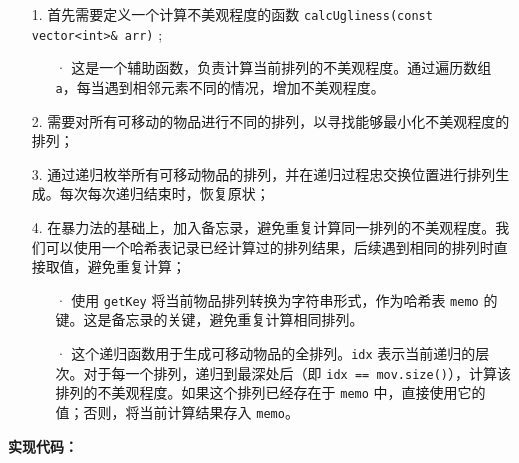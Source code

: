 \documentclass[a4paper]{ctexart}
\begin{document}
\begin{itemize}
	\item[1.] 首先需要定义一个计算不美观程度的函数 \texttt{calcUgliness(const vector<int>\& arr)} ;
		\begin{itemize}
			\item[·] 这是一个辅助函数，负责计算当前排列的不美观程度。通过遍历数组 \texttt{a}，每当遇到相邻元素不同的情况，增加不美观程度。
		\end{itemize}
	
	\item[2.] 需要对所有可移动的物品进行不同的排列，以寻找能够最小化不美观程度的排列；
	
	\item[3.] 通过递归枚举所有可移动物品的排列，并在递归过程忠交换位置进行排列生成。每次每次递归结束时，恢复原状；
	
	\item[4.] 在暴力法的基础上，加入备忘录，避免重复计算同一排列的不美观程度。我们可以使用一个哈希表记录已经计算过的排列结果，后续遇到相同的排列时直接取值，避免重复计算；
		\begin{itemize}
			\item[·] 使用 \texttt{getKey} 将当前物品排列转换为字符串形式，作为哈希表 \texttt{memo} 的键。这是备忘录的关键，避免重复计算相同排列。
			
			\item[·] 这个递归函数用于生成可移动物品的全排列。\texttt{idx} 表示当前递归的层次。对于每一个排列，递归到最深处后（即 \texttt{idx == mov.size()}），计算该排列的不美观程度。如果这个排列已经存在于 \texttt{memo} 中，直接使用它的值；否则，将当前计算结果存入 \texttt{memo}。
		\end{itemize}
	
	
\end{itemize}

\noindent\textbf{实现代码：}
	
\end{document}
